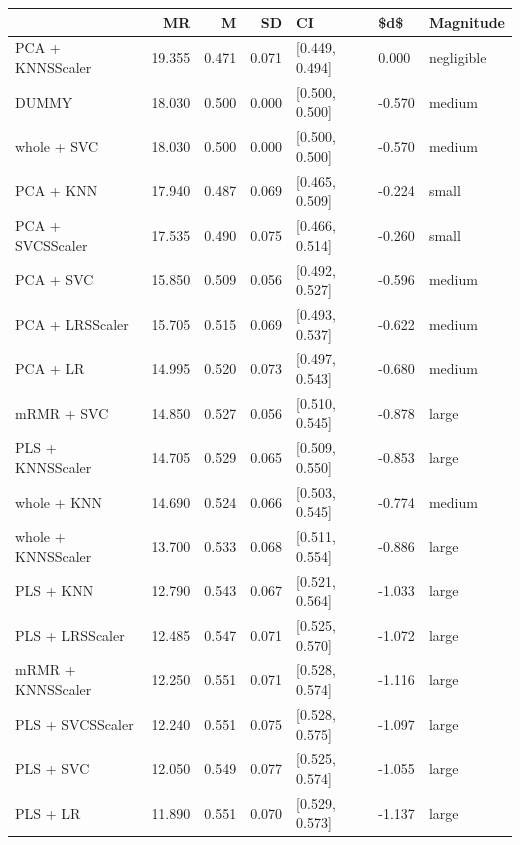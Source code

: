 \documentclass[a4paper,oneside,11pt,leqno]{article}
\begin{document}
	\begin{table}[h]
		\centering
		\begin{tabular}{lrrrlll}
			\toprule
			{} &     MR &     M &    SD &              CI &    \$d\$ &   Magnitude \\
			\midrule
			PCA + KNNSScaler   & 19.355 & 0.471 & 0.071 &  [0.449, 0.494] &  0.000 &  negligible \\
			DUMMY              & 18.030 & 0.500 & 0.000 &  [0.500, 0.500] & -0.570 &      medium \\
			whole + SVC        & 18.030 & 0.500 & 0.000 &  [0.500, 0.500] & -0.570 &      medium \\
			PCA + KNN          & 17.940 & 0.487 & 0.069 &  [0.465, 0.509] & -0.224 &       small \\
			PCA + SVCSScaler   & 17.535 & 0.490 & 0.075 &  [0.466, 0.514] & -0.260 &       small \\
			PCA + SVC          & 15.850 & 0.509 & 0.056 &  [0.492, 0.527] & -0.596 &      medium \\
			PCA + LRSScaler    & 15.705 & 0.515 & 0.069 &  [0.493, 0.537] & -0.622 &      medium \\
			PCA + LR           & 14.995 & 0.520 & 0.073 &  [0.497, 0.543] & -0.680 &      medium \\
			mRMR + SVC         & 14.850 & 0.527 & 0.056 &  [0.510, 0.545] & -0.878 &       large \\
			PLS + KNNSScaler   & 14.705 & 0.529 & 0.065 &  [0.509, 0.550] & -0.853 &       large \\
			whole + KNN        & 14.690 & 0.524 & 0.066 &  [0.503, 0.545] & -0.774 &      medium \\
			whole + KNNSScaler & 13.700 & 0.533 & 0.068 &  [0.511, 0.554] & -0.886 &       large \\
			PLS + KNN          & 12.790 & 0.543 & 0.067 &  [0.521, 0.564] & -1.033 &       large \\
			PLS + LRSScaler    & 12.485 & 0.547 & 0.071 &  [0.525, 0.570] & -1.072 &       large \\
			mRMR + KNNSScaler  & 12.250 & 0.551 & 0.071 &  [0.528, 0.574] & -1.116 &       large \\
			PLS + SVCSScaler   & 12.240 & 0.551 & 0.075 &  [0.528, 0.575] & -1.097 &       large \\
			PLS + SVC          & 12.050 & 0.549 & 0.077 &  [0.525, 0.574] & -1.055 &       large \\
			PLS + LR           & 11.890 & 0.551 & 0.070 &  [0.529, 0.573] & -1.137 &       large \\

\end{tabular}
\end{table}
\end{document}
